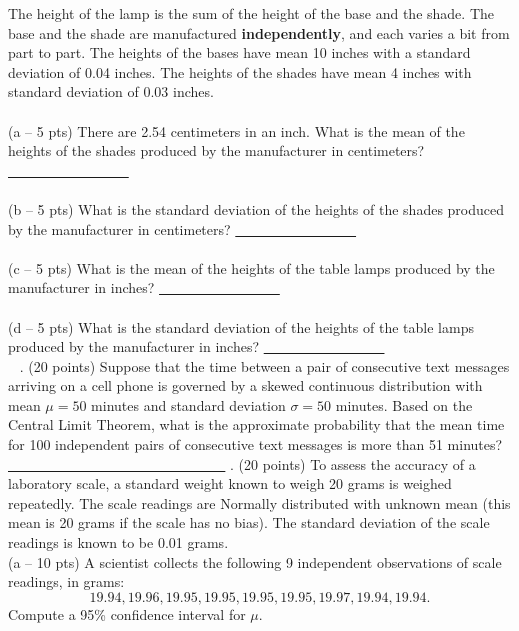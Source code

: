 \documentclass[12pt]{article}
\def\nn{\noindent}
\begin{document}
The height of the lamp is the sum of the height of the base and the shade.  The base and the shade are manufactured
{\bf independently}, and each varies a bit from part to part.  The heights of the bases have mean 10 inches with 
a standard deviation of 0.04 inches.  The heights of the shades have mean 4 inches with standard deviation
of 0.03 inches. \\ \\
\nn (a -- 5 pts) There are 2.54 centimeters in an inch.  What is the mean of the heights of the
shades produced by the manufacturer in centimeters? {\bf \underline{\ \ \ \ \ \ \ \ \ \ \ \ \ \ \ }} \\ \\
\nn (b -- 5 pts) What is the standard deviation of the heights of 
the shades produced by the manufacturer in centimeters? {\bf \underline{\ \ \ \ \ \ \ \ \ \ \ \ \ \ \ }} \\ \\
\nn (c -- 5 pts) What is the mean of the heights of the table lamps produced by the manufacturer in 
inches? {\bf \underline{\ \ \ \ \ \ \ \ \ \ \ \ \ \ \ }} \\ \\
\nn (d -- 5 pts) What is the standard deviation of the heights of the table lamps produced by the 
manufacturer in inches? {\bf \underline{\ \ \ \ \ \ \ \ \ \ \ \ \ \ \ }} \\ \
\newpage
\nn 3. (20 points) Suppose that the time between a pair of consecutive text messages arriving on a cell phone is governed by a skewed continuous distribution with mean $\mu=50$ minutes and standard deviation $\sigma=50$ minutes. 
Based on the Central Limit Theorem, what is the approximate probability that the mean time for 100 independent pairs of consecutive text messages is more than 51 minutes? {\bf \underline{\ \ \ \ \ \ \ \ \ \ \ \ \ \ \ \ \ \ \ \ \ \ \ \ \ \ \ }}
\newpage
\nn 4. (20 points) To assess the accuracy of a laboratory scale, a standard weight known to weigh 20 grams is weighed repeatedly.  The scale readings are Normally distributed with unknown mean (this mean is 20 grams if the scale has no bias).  The standard deviation of the scale readings is known to be 0.01 grams. \\ 
(a -- 10 pts) A scientist collects the following 9 independent observations of scale readings, in grams:
\[
19.94, 19.96, 19.95, 19.95, 19.95, 19.95, 19.97, 19.94, 19.94.
\]
Compute a 95\% confidence interval for $\mu$.  \\ 
\end{document}

